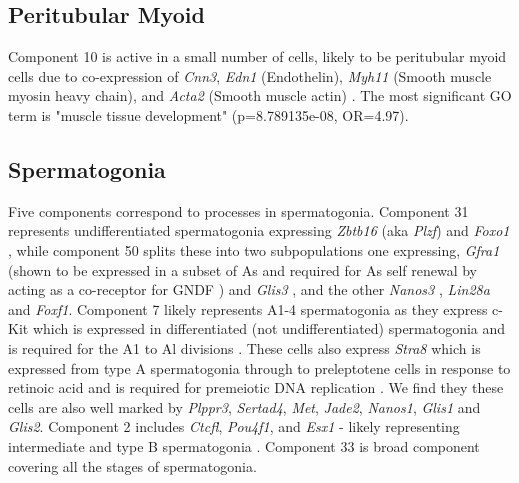 \subsection{Peritubular Myoid}

Component 10 is active in a small number of cells, likely to be peritubular myoid cells due to co-expression of \textit{Cnn3}, \textit{Edn1} (Endothelin), \textit{Myh11} (Smooth muscle myosin heavy chain), and \textit{Acta2} (Smooth muscle actin) \parencite{Mayerhofer2013Human}. The most significant GO term is "muscle tissue development" (p=8.789135e-08, OR=4.97).





\subsection{Spermatogonia}


Five components correspond to processes in spermatogonia. Component 31 represents undifferentiated spermatogonia expressing \textit{Zbtb16} (aka \textit{Plzf}) \parencite{Buaas2004Plzf} and \textit{Foxo1} \parencite{Goertz2011Foxo1}, while component 50 splits these into two subpopulations one expressing, \textit{Gfra1} (shown to be expressed in a subset of As and required for As self renewal by acting as a co-receptor for GNDF \parencite{Meng2000Regulation,He2007Gfra1}) and \textit{Glis3} \parencite{Kang2016Transcription}, and the other \textit{Nanos3} \parencite{Suzuki2009heterogeneity}, \textit{Lin28a} \parencite{Zheng2009pluripotency} and \textit{Foxf1}. Component 7 likely represents A1-4 spermatogonia as they express c-Kit which is expressed in differentiated (not undifferentiated) spermatogonia \parencite{Manova1990Gonadal,Schrans-Stassen1999Differential} and is required for the A1 to Al divisions \parencite{Yoshinaga1991Role}. These cells also express \textit{Stra8} which is expressed from type A spermatogonia through to preleptotene cells in response to retinoic acid \parencite{Oulad-Abdelghani1996Characterization,Zhou2008Expressiona,Endo2015Periodic} and is required for premeiotic DNA replication \parencite{Baltus2006germ}. We find they these cells are also well marked by \textit{Plppr3}, \textit{Sertad4}, \textit{Met}, \textit{Jade2}, \textit{Nanos1}, \textit{Glis1} and \textit{Glis2}. Component 2 includes \textit{Ctcfl}, \textit{Pou4f1}, and \textit{Esx1} - likely representing intermediate and type B spermatogonia \parencite{Sleutels2012male, Budhram-Mahadeo2001closely, Maezawa2018Dynamic, Li1997Esx1, Branford1997Spx1}. Component 33 is broad component covering all the stages of spermatogonia.


